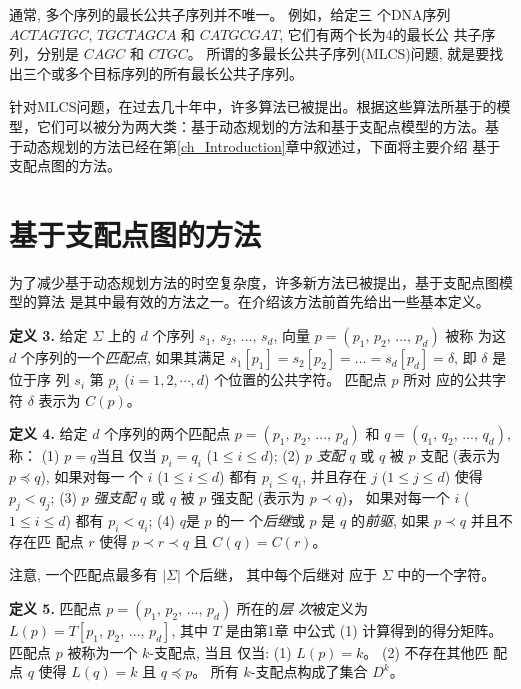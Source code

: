 通常, 多个序列的最长公共子序列并不唯一。 例如，给定三
个DNA序列 $ACTAGTGC$, $TGCTAGCA$ 和 $CATGCGAT$, 它们有两个长为4的最长公
共子序列，分别是 $CAGC$ 和 $CTGC$。 所谓的多最长公共子序列(MLCS)问题,
就是要找出三个或多个目标序列的所有最长公共子序列。

针对MLCS问题，在过去几十年中，许多算法已被提出。根据这些算法所基于的模
型，它们可以被分为两大类：基于动态规划的方法和基于支配点模型的方法。基
于动态规划的方法已经在第\ref{ch_Introduction}章中叙述过，下面将主要介绍
基于支配点图的方法。


\section{基于支配点图的方法}
\label{sec:Dominant Point}

为了减少基于动态规划方法的时空复杂度，许多新方法已被提出，基于支配点图模型的算法
是其中最有效的方法之一。在介绍该方法前首先给出一些基本定义。

\vspace{0.2cm}\textbf{定义 3.} 给定 $\Sigma$ 上的 $d$ 个序列
$s_1,\, s_2,\, ...,\, s_d$, 向量 $p = (p_1,\, p_2,\, ...,\, p_d)$ 被称
为这 $d$ 个序列的一个\emph{匹配点}, 如果其满足
$s_1[p_1] = s_2[p_2] = ... = s_d[p_d] = \delta$, 即 $\delta$ 是位于序
列 $s_i$ 第 $p_i$ ($i=1,2,\cdots,d$) 个位置的公共字符。 匹配点 $p$ 所对
应的公共字符 $\delta$ 表示为 $C(p)$。

\textbf{定义 4.} 给定 $d$ 个序列的两个匹配点 $p = (p_1,\, p_2,\,
...,\, p_d)$ 和 $q = (q_1,\, q_2,\, ...,\, q_d)$, 称： (1) $p = q$当且
仅当 $p_i = q_i$ ($1 \leq i \leq d$); (2) $p$
\emph{支配 }$q$ 或 $q$ 被 $p$ 支配 (表示为 $p \preceq q$), 如果对每一
个 $i$ ($1 \leq i \leq d$) 都有 $p_i \leq q_i$, 并且存在 $j$
($1 \leq j \leq d$) 使得 $p_j<q_j$; (3) $p$ \emph{强支配}
$q$ 或 $q$ 被 $p$ 强支配 (表示为 $p \prec q$)， 如果对每一个 $i$ ($1
\leq i \leq d$) 都有 $p_i < q_i$; (4) $q$是 $p$ 的一
个\emph{后继}或 $p$ 是 $q$ 的\emph{前驱}, 如果 $p \prec q$ 并且不存在匹
配点 $r$ 使得 $p \prec r \prec q$ 且 $C(q) = C(r)$。

\vspace{0.2cm}注意, 一个匹配点最多有 $|\Sigma|$ 个后继， 其中每个后继对
应于 $\Sigma$ 中的一个字符。

\textbf{定义 5.} 匹配点 $p = (p_1,\, p_2,\, ...,\, p_d)$ 所在的\emph{层
  次}被定义为 $L(p) = T[p_1,\, p_2,\, ...,\, p_d]$, 其中 $T$ 是由第1章
中公式 (1) 计算得到的得分矩阵。 匹配点 $p$ 被称为一个 $k$-支配点, 当且
仅当: (1) $L(p) = k$。 (2) 不存在其他匹
配点 $q$ 使得 $L(q) = k$ 且 $q \preceq p$。 所有 $k$-支配点构成了集合 $D^k$。

